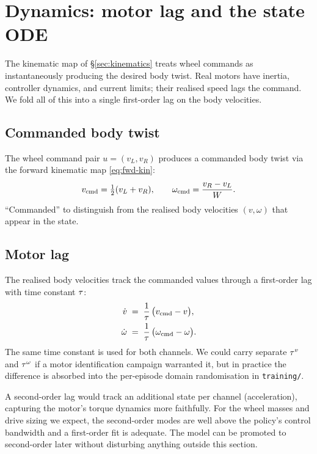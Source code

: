 \section{Dynamics: motor lag and the state ODE}
\label{sec:dynamics}

The kinematic map of \S\ref{sec:kinematics} treats wheel commands as instantaneously producing the desired body twist. Real motors have inertia, controller dynamics, and current limits; their realised speed lags the command. We fold all of this into a single first-order lag on the body velocities.

\subsection{Commanded body twist}

The wheel command pair $u = (v_L, v_R)$ produces a commanded body twist via the forward kinematic map \eqref{eq:fwd-kin}:
\begin{equation}
    v_{\text{cmd}} = \tfrac{1}{2}(v_L + v_R),
    \qquad
    \omega_{\text{cmd}} = \frac{v_R - v_L}{W}.
    \label{eq:body-cmd}
\end{equation}
``Commanded'' to distinguish from the realised body velocities $(v, \omega)$ that appear in the state.

\subsection{Motor lag}

The realised body velocities track the commanded values through a first-order lag with time constant $\tau$:
\begin{align}
    \dot v       &\;=\; \frac{1}{\tau}\,\bigl(v_{\text{cmd}} - v\bigr),
    \label{eq:vdot} \\
    \dot \omega  &\;=\; \frac{1}{\tau}\,\bigl(\omega_{\text{cmd}} - \omega\bigr).
    \label{eq:omegadot}
\end{align}
The same time constant is used for both channels. We could carry separate $\tau^{v}$ and $\tau^{\omega}$ if a motor identification campaign warranted it, but in practice the difference is absorbed into the per-episode domain randomisation in \texttt{training/}.

\begin{remark}
A second-order lag would track an additional state per channel (acceleration), capturing the motor's torque dynamics more faithfully. For the wheel masses and drive sizing we expect, the second-order modes are well above the policy's control bandwidth and a first-order fit is adequate. The model can be promoted to second-order later without disturbing anything outside this section.
\end{remark}

